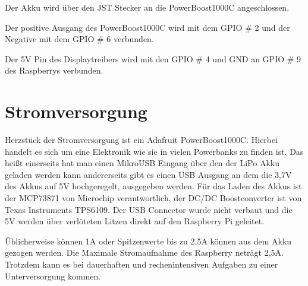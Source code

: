 Der Akku wird über den JST Stecker an die PowerBoost1000C angeschlossen. 

Der positive Ausgang des PowerBoost1000C wird mit dem GPIO \# 2 und der Negative mit dem GPIO \# 6 verbunden. 

Der 5V Pin des Displaytreibers wird mit den GPIO \# 4 und GND an GPIO \# 9 des Raspberrys verbunden. 

\section{Stromversorgung}

Herzstück der Stromversorgung ist ein Adafruit PowerBoost1000C. Hierbei handelt es sich um eine Elektronik wie sie in vielen Powerbanks zu finden ist. Das heißt einerseits hat man einen MikroUSB Eingang über den der LiPo Akku geladen werden kann andererseits gibt es einen USB Ausgang an dem die 3,7V des Akkus auf 5V hochgeregelt, ausgegeben werden. Für das Laden des Akkus ist der MCP73871 von Microchip verantwortlich, der DC/DC Boostconverter ist von Texas Instruments TPS6109. Der USB Connector wurde nicht verbaut und die 5V werden über verlöteten Litzen direkt auf den Raspberry Pi geleitet. 

Üblicherweise können 1A oder Spitzenwerte bis zu 2,5A können aus dem Akku gezogen werden. Die Maximale Stromaufnahme des Raspberry neträgt 2,5A. Trotzdem kann es bei dauerhaften und rechenintensiven Aufgaben zu einer Unterversorgung kommen. 


